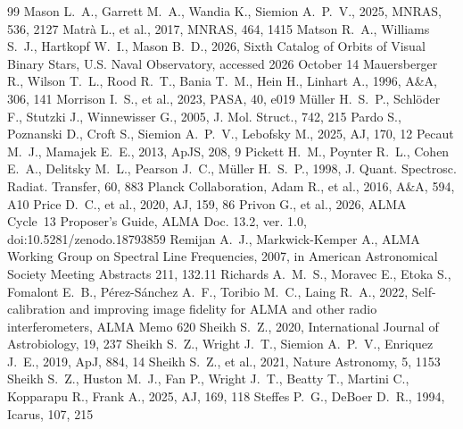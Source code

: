 \documentclass[twocolumn,twocolappendix,numberedappendix,appendixfloats]{openjournal}
\begin{document}
\begin{thebibliography}{99}
 Mason L.~A., Garrett M.~A., Wandia K., Siemion A.~P.~V., 2025, MNRAS, 536, 2127
 Matrà L., et al., 2017, MNRAS, 464, 1415
 Matson R.~A., Williams S.~J., Hartkopf W.~I., Mason B.~D., 2026, Sixth Catalog of Orbits of Visual Binary Stars, U.S. Naval Observatory, accessed 2026 October 14
 Mauersberger R., Wilson T.~L., Rood R.~T., Bania T.~M., Hein H., Linhart A., 1996, A\&A, 306, 141
 Morrison I.~S., et al., 2023, PASA, 40, e019
 M\"uller H.~S.~P., Schl\"oder F., Stutzki J., Winnewisser G., 2005, J. Mol. Struct., 742, 215
 Pardo S., Poznanski D., Croft S., Siemion A.~P.~V., Lebofsky M., 2025, AJ, 170, 12
 Pecaut M.~J., Mamajek E.~E., 2013, ApJS, 208, 9
 Pickett H.~M., Poynter R.~L., Cohen E.~A., Delitsky M.~L., Pearson J.~C., M\"uller H.~S.~P., 1998, J. Quant. Spectrosc. Radiat. Transfer, 60, 883
 Planck Collaboration, Adam R., et al., 2016, A\&A, 594, A10
 Price D.~C., et al., 2020, AJ, 159, 86
 Privon G., et al., 2026, ALMA Cycle~13 Proposer's Guide, ALMA Doc. 13.2, ver. 1.0, doi:10.5281/zenodo.18793859
 Remijan A.~J., Markwick-Kemper A., ALMA Working Group on Spectral Line Frequencies, 2007, in American Astronomical Society Meeting Abstracts 211, 132.11
 Richards A.~M.~S., Moravec E., Etoka S., Fomalont E.~B., P\'erez-S\'anchez A.~F., Toribio M.~C., Laing R.~A., 2022, Self-calibration and improving image fidelity for ALMA and other radio interferometers, ALMA Memo 620
 Sheikh S.~Z., 2020, International Journal of Astrobiology, 19, 237
 Sheikh S.~Z., Wright J.~T., Siemion A.~P.~V., Enriquez J.~E., 2019, ApJ, 884, 14
 Sheikh S.~Z., et al., 2021, Nature Astronomy, 5, 1153
 Sheikh S.~Z., Huston M.~J., Fan P., Wright J.~T., Beatty T., Martini C., Kopparapu R., Frank A., 2025, AJ, 169, 118
 Steffes P.~G., DeBoer D.~R., 1994, Icarus, 107, 215

\end{thebibliography}
\end{document}
